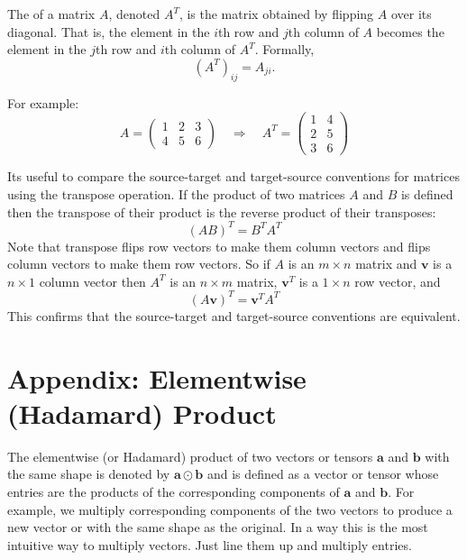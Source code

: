 The  of a matrix \( A \), denoted \( A^T \), is the matrix obtained by flipping \( A \) over its diagonal. That is, the element in the \( i \)th row and \( j \)th column of \( A \) becomes the element in the \( j \)th row and \( i \)th column of \( A^T \). Formally, 
\[
(A^T)_{ij} = A_{ji}.
\]

For example: 
\[
A = \begin{pmatrix}
1 & 2 & 3 \\
4 & 5 & 6
\end{pmatrix}
\quad \Rightarrow \quad
A^T = \begin{pmatrix}
1 & 4 \\
2 & 5 \\
3 & 6
\end{pmatrix}
\]

   Its useful to compare the source-target and target-source conventions for 
matrices using the transpose operation. If the product of two matrices $A$ and 
$B$ is defined then the transpose of their product is the reverse product of 
their transposes:
\begin{equation*}
       \left(AB\right)^T = B^T A^T                 
\end{equation*}
Note that transpose flips row vectors to make them column vectors and flips
column vectors to make them row vectors. So if $A$ is an $m \times n$ matrix 
and $\mathbf{v}$ is a $n \times 1$ column vector then $A^T$ is an $n \times m$
matrix, $\mathbf{v}^T$ is a $1 \times n$ row vector, and
\begin{equation*}
       \left(A \mathbf{v} \right)^T =  \mathbf{v}^T A^T                 
\end{equation*}
This confirms that the source-target and target-source conventions are
equivalent.

\section{Appendix: Elementwise (Hadamard) Product}\label{hadamard}

The elementwise (or Hadamard) product of two vectors or tensors $\mathbf{a}$ and $\mathbf{b}$ with the same shape is denoted by $\mathbf{a} \odot \mathbf{b}$ and is defined as a vector or tensor whose entries are the products of the corresponding components of $\mathbf{a}$  and $\mathbf{b}$. For example, we multiply corresponding components of the two vectors to produce a new vector or with the same shape as the original. In a way this is the most intuitive way to multiply vectors. Just line them up and multiply entries.

